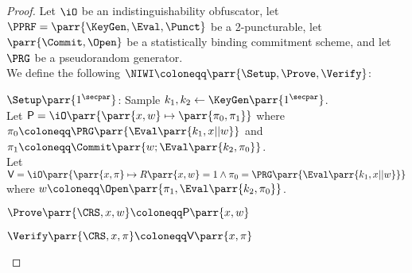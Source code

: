 \begin{proof}
    Let \(\iO\) be an indistinguishability obfuscator,
    let \(\PPRF = \parr{\KeyGen, \Eval, \Punct}\) be a 2-puncturable,
    let \(\parr{\Commit,\Open}\) be a statistically binding commitment scheme,
    and let \(\PRG\) be a pseudorandom generator.
    \\
    We define the following \(\NIWI \coloneqq \parr{\Setup, \Prove, \Verify}\):
    \begin{sitemize}
        \item \(\Setup\parr{1^\secpar}\):
        Sample \(k_1,k_2 \gets \KeyGen\parr{1^\secpar}\).
        \\
        Let \(\textsf{P} = \iO\parr{\parr{x, w} \mapsto \parr{\pi_0,\pi_1}}\) where \(\pi_0 \coloneqq \PRG\parr{\Eval\parr{k_1,x||w}}\) and \(\pi_1 \coloneqq \Commit\parr{w; \Eval\parr{k_2,\pi_0}}\).
        \\
        Let \(\textsf{V} = \iO\parr{\parr{x, \pi} \mapsto R\parr{x,w} = 1 \wedge \pi_0 = \PRG\parr{\Eval\parr{k_1,x||w}}}\) where \(w \coloneqq \Open\parr{\pi_1, \Eval\parr{k_2,\pi_0}}\).

        \item \(\Prove\parr{\CRS,x,w} \coloneqq \textsf{P}\parr{x,w}\)

        \item \(\Verify\parr{\CRS,x,\pi} \coloneqq \textsf{V}\parr{x,\pi}\)
    \end{sitemize}


\end{proof}
